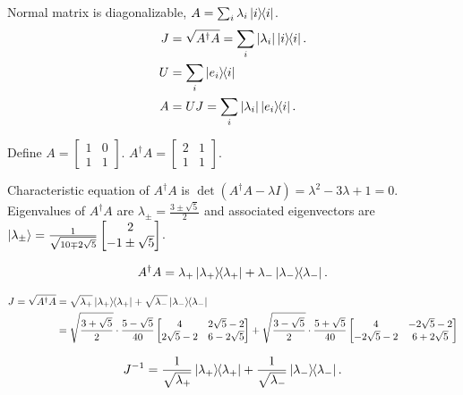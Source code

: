 
Normal matrix is diagonalizable, $A = \sum_i \lambda_i \ket{i}\hspace{-1mm} \bra{i}$.
\begin{align*}
	J &= \sqrt{A^\dagger A} = \sum_i | \lambda_i | \ket{i}\hspace{-1mm} \bra{i}.\\
	U &= \sum_i \ket{e_i}\hspace{-1mm} \bra{i}\\
	A &= UJ = \sum_i |\lambda_i| \ket{e_i}\hspace{-1mm} \bra{i}.
\end{align*}




Define
$A = \begin{bmatrix}
1 & 0 \\
1 & 1
\end{bmatrix}$.
%
$A^\dagger A = \begin{bmatrix}
2 & 1 \\
1 & 1
\end{bmatrix}$.

 Characteristic equation of $A^\dagger A$ is $\det(A^\dagger A - \lambda I) = \lambda^2 - 3 \lambda + 1 = 0$.
 Eigenvalues of $A^\dagger A$ are $\lambda_\pm = \frac{3 \pm \sqrt{5}}{2}$
 and associated eigenvectors are $\ket{\lambda_\pm} = \frac{1}{\sqrt{10 \mp 2 \sqrt{5}}} \begin{bmatrix}
 2 \\
 -1 \pm \sqrt{5}
 \end{bmatrix} $.

\begin{align*}
	A^\dagger A = \lambda_+ \ket{\lambda_+}\hspace{-1mm} \bra{\lambda_+} + \lambda_- \ket{\lambda_-}\hspace{-1mm} \bra{\lambda_-}.
\end{align*}

 \begin{align*}
 	J = \sqrt{A^\dagger A} &= \sqrt{\lambda_+} \ket{\lambda_+}\hspace{-1mm} \bra{\lambda_+} + \sqrt{\lambda_-} \ket{\lambda_-}\hspace{-1mm} \bra{\lambda_-}\\
 		&= \sqrt{\frac{3 + \sqrt{5}}{2}} \cdot \frac{5 - \sqrt{5}}{40} \begin{bmatrix}
 		4 & 2\sqrt{5} -2 \\
 		2 \sqrt{5} - 2 & 6 -2\sqrt{5}
 		\end{bmatrix}
 		+
 		\sqrt{\frac{3 - \sqrt{5}}{2}} \cdot \frac{5 + \sqrt{5}}{40} \begin{bmatrix}
 		4 & -2\sqrt{5} -2 \\
 		-2 \sqrt{5} - 2 & 6 +2\sqrt{5}
 		\end{bmatrix}
 \end{align*}


\begin{align*}
	J^{-1} = \frac{1}{ \sqrt{\lambda_+} } \ket{\lambda_+}\hspace{-1mm} \bra{\lambda_+} + \frac{1}{ \sqrt{\lambda_-} } \ket{\lambda_-}\hspace{-1mm} \bra{\lambda_-}.
\end{align*}


